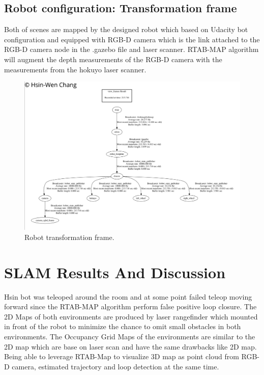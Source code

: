 \documentclass[10pt,journal,compsoc]{IEEEtran}
\begin{document}
\subsection{Robot configuration: Transformation frame}
Both of scenes are mapped by the designed robot which based on Udacity bot configuration and equipped with RGB-D camera which is the link attached to the RGB-D camera node in the .gazebo file and laser scanner. RTAB-MAP algorithm will augment the depth measurements of the RGB-D camera with the measurements from the hokuyo laser scanner.

\begin{figure}[thpb]
      \centering
      \includegraphics[width=\linewidth]{TransformFrames.png}
      \caption{Robot transformation frame.}
      \label{fig:robot1}
\end{figure}
\section{SLAM Results And Discussion}
Hsin bot was teleoped around the room and at some point failed teleop moving forward since the RTAB-MAP algorithm perform false positive loop closure. The 2D Maps of both environments are produced by laser rangefinder which mounted in front of the robot to minimize the chance to omit small obstacles in both environments. The Occupancy Grid Maps of the environments are similar to the 2D map which are base on laser scan and have the same drawbacks like 2D map. Being able to leverage RTAB-Map to visualize 3D map as point cloud from RGB-D camera, estimated trajectory and loop detection at the same time.
\end{document}
